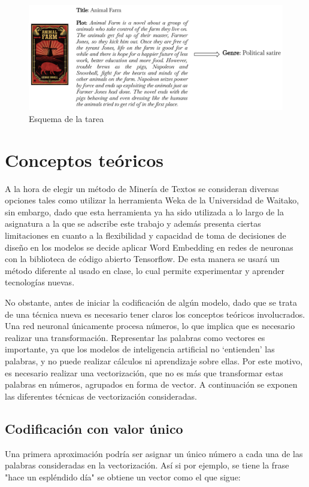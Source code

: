 \documentclass[12pt,a4paper, xcolor=table]{article}
\begin{document}
\vspace{12mm}

  \begin{figure}[!h]
    \centering
    \includegraphics[width=450px]{img/Animal Farm.png}
    \caption{Esquema de la tarea}
    \end{figure}

\newpage

\section{Conceptos teóricos}
A la hora de elegir un método de Minería de Textos se consideran diversas opciones tales como utilizar la herramienta Weka de la Universidad de Waitako, sin embargo, dado que esta herramienta ya ha sido utilizada a lo largo de la asignatura a la que se adscribe este trabajo y además presenta ciertas limitaciones en cuanto a la flexibilidad y capacidad de toma de decisiones de diseño en los modelos se decide aplicar Word Embedding en redes de neuronas con la biblioteca de código abierto Tensorflow. De esta manera se usará un método diferente al usado en clase, lo cual permite experimentar y aprender tecnologías nuevas. 

\vspace{3mm}

No obstante, antes de iniciar la codificación de algún modelo, dado que se trata de una técnica nueva es necesario tener claros los conceptos teóricos involucrados. Una red neuronal únicamente procesa números, lo que implica que es necesario realizar una transformación. Representar las palabras como vectores es importante, ya que los modelos de inteligencia artificial no ‘entienden’ las palabras, y no puede realizar cálculos ni aprendizaje sobre ellas. Por este motivo, es necesario realizar una vectorización, que no es más que transformar estas palabras en números, agrupados en forma de vector. A continuación se exponen las diferentes técnicas de vectorización consideradas.

\subsection{Codificación con valor único}
Una primera aproximación podría ser asignar un único número a cada una de las palabras consideradas en la vectorización. Así si por ejemplo, se tiene la frase "hace un espléndido día" se obtiene un vector como el que sigue:
\end{document}
